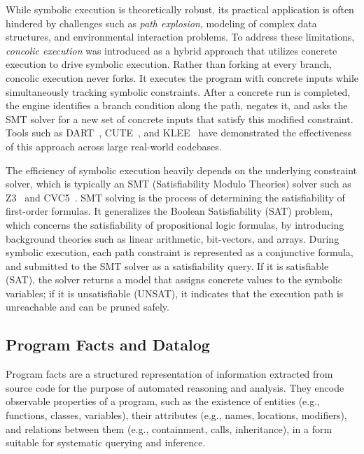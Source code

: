 While symbolic execution is theoretically robust, its practical application is often hindered by challenges such as \textit{path explosion}, modeling of complex data structures, and environmental interaction problems. To address these limitations, \textit{concolic execution} was introduced as a hybrid approach that utilizes concrete execution to drive symbolic execution. Rather than forking at every branch, concolic execution never forks. It executes the program with concrete inputs while simultaneously tracking symbolic constraints. After a concrete run is completed, the engine identifies a branch condition along the path, negates it, and asks the SMT solver for a new set of concrete inputs that satisfy this modified constraint. Tools such as DART~\cite{godefroid2005dart}, CUTE~\cite{sen2005cute}, and KLEE~\cite{cadar2008klee} have demonstrated the effectiveness of this approach across large real-world codebases.

The efficiency of symbolic execution heavily depends on the underlying constraint solver, which is typically an SMT (Satisfiability Modulo Theories) solver 
such as Z3~\cite{de2008z3} and CVC5~\cite{barbosa2022cvc5}. SMT solving is the process of determining the satisfiability of first-order formulas. It generalizes the Boolean Satisfiability (SAT) problem, which concerns the satisfiability of propositional logic formulas, by introducing background theories such as linear arithmetic, bit-vectors, and arrays. During symbolic execution, each path constraint is represented as a conjunctive formula, and submitted to the SMT solver as a satisfiability query. If it is satisfiable (SAT), the solver returns a model that assigns concrete values to the symbolic variables; if it is unsatisfiable (UNSAT), it indicates that the execution path is unreachable and can be pruned safely. 

\subsection{Program Facts and Datalog}\label{sec:background-program-facts-datalog}
Program facts are a structured representation of information extracted from source code for the purpose of automated reasoning and analysis. They encode observable properties of a program, such as the existence of entities (e.g., functions, classes, variables), their attributes (e.g., names, locations, modifiers), and relations between them (e.g., containment, calls, inheritance), in a form suitable for systematic querying and inference.

